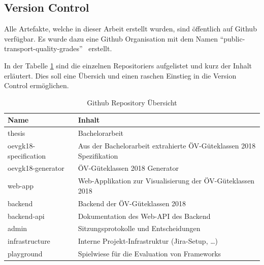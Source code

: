 \subsection{Version Control}
\label{Infrastruktur:Version Control}

Alle Artefakte, welche in dieser Arbeit erstellt wurden, sind öffentlich auf Github verfügbar.
Es wurde dazu eine Github Organisation mit dem Namen "`public-transport-quality-grades"'~\cite{github} erstellt.

In der Tabelle \ref{table:github_overview} sind die einzelnen Repositoriers aufgelistet und kurz der Inhalt erläutert.
Dies soll eine Übersich und einen raschen Einstieg in die Version Control ermöglichen.

\begin{table}[H]
    \begin{tabular}{l p{10.6cm}}
        \toprule
        \textbf{Name}           & \textbf{Inhalt}\\
        \midrule
        thesis~\cite{github:thesis}
                                & Bachelorarbeit\\
        oevgk18-specification~\cite{github:oevgk18-specification}
                                & Aus der Bachelorarbeit extrahierte \acs{ÖV}-Güteklassen 2018 Spezifikation\\
        oevgk18-generator~\cite{github:oevgk18-generator}
                                & \acs{ÖV}-Güteklassen 2018 Generator\\
        web-app~\cite{github:web-app}
                                & Web-Applikation zur Visualisierung der \acs{ÖV}-Güteklassen 2018\\
        backend~\cite{github:backend}
                                & Backend der \acs{ÖV}-Güteklassen 2018\\
        backend-api~\cite{github:backend-api}
                                & Dokumentation des Web-\acs{API} des Backend\\
        admin~\cite{github:admin}
                                & Sitzungsprotokolle und Entscheidungen\\
        infrastructure~\cite{github:infrastructure}
                                & Interne Projekt-Infrastruktur (Jira-Setup, \dots)\\  
        playground~\cite{github:playground}
                                & Spielwiese für die Evaluation von Frameworks\\
                                
        \bottomrule
    \end{tabular}
    \caption{Github Repository Übersicht}
    \label{table:github_overview}
\end{table}